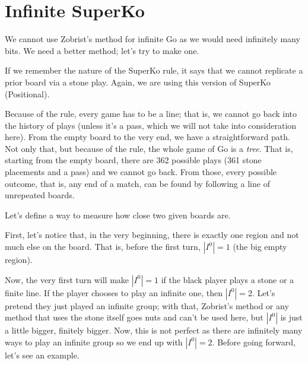 \section{Infinite SuperKo}

We cannot use Zobrist's method for infinite Go as we would need infinitely many bits. We need a better method; let's try to make one.

If we remember the nature of the SuperKo rule, it says that we cannot replicate a prior board via a stone play. Again, we are using this version of SuperKo (Positional).

Because of the rule, every game has to be a line; that is, we cannot go back into the history of plays (unless it's a pass, which we will not take into consideration here). From the empty board to the very end, we have a straightforward path. Not only that, but because of the rule, the whole game of Go is a \textit{tree}. That is, starting from the empty board, there are 362 possible plays (361 stone placements and a pass) and we cannot go back. From those, every possible outcome, that is, any end of a match, can be found by following a line of unrepeated boards.

Let's define a way to measure how close two given boards are.

First, let's notice that, in the very beginning, there is exactly one region and not much else on the board. That is, before the first turn, $|I^0|=1$ (the big empty region).

Now, the very first turn will make $|I^0|=1$ if the black player plays a stone or a finite line. If the player chooses to play an infinite one, then $|I^0|=2$. Let's pretend they just played an infinite group; with that, Zobrist's method or any method that uses the stone itself goes nuts and can't be used here, but $|I^0|$ is just a little bigger, finitely bigger. Now, this is not perfect as there are infinitely many ways to play an infinite group so we end up with $|I^0|=2$. Before going forward, let's see an example.

